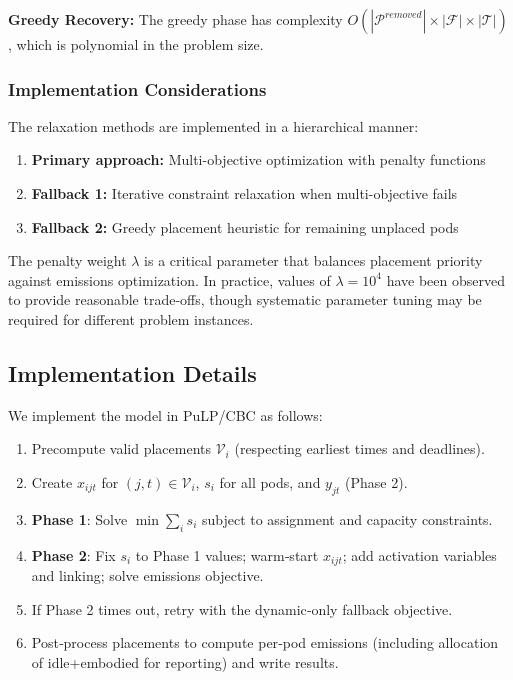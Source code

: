 \documentclass{article}
\begin{document}
\textbf{Greedy Recovery:}
The greedy phase has complexity $O(|\mathcal{P}^{removed}| \times |\mathcal{F}| \times |\mathcal{T}|)$, which is polynomial in the problem size.

\subsubsection{Implementation Considerations}

The relaxation methods are implemented in a hierarchical manner:
\begin{enumerate}
\item \textbf{Primary approach:} Multi-objective optimization with penalty functions
\item \textbf{Fallback 1:} Iterative constraint relaxation when multi-objective fails
\item \textbf{Fallback 2:} Greedy placement heuristic for remaining unplaced pods
\end{enumerate}

The penalty weight $\lambda$ is a critical parameter that balances placement priority against emissions optimization. In practice, values of $\lambda = 10^4$ have been observed to provide reasonable trade-offs, though systematic parameter tuning may be required for different problem instances.

\subsection{Implementation Details}

We implement the model in PuLP/CBC as follows:
\begin{enumerate}
\item Precompute valid placements $\mathcal{V}_i$ (respecting earliest times and deadlines).
\item Create $x_{ijt}$ for $(j,t) \in \mathcal{V}_i$, $s_i$ for all pods, and $y_{jt}$ (Phase 2).
\item \textbf{Phase 1}: Solve $\min \sum_i s_i$ subject to assignment and capacity constraints.
\item \textbf{Phase 2}: Fix $s_i$ to Phase 1 values; warm‑start $x_{ijt}$; add activation variables and linking; solve emissions objective.
\item If Phase 2 times out, retry with the dynamic‑only fallback objective.
\item Post‑process placements to compute per‑pod emissions (including allocation of idle+embodied for reporting) and write results.
\end{enumerate}
\end{document}
